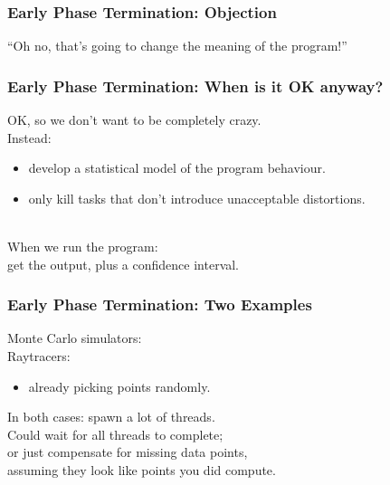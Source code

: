 \begin{frame}
  \frametitle{Early Phase Termination: Objection}

\Huge
\begin{center}
``Oh no, that's going to change the meaning of the program!''
\end{center}
\end{frame}

\begin{frame}
  \frametitle{Early Phase Termination: When is it OK anyway?}


OK, so we don't want to be completely crazy.\\[1em]

Instead: 
\begin{itemize}
\item develop a statistical model of the program behaviour.
\item only kill tasks that don't introduce unacceptable distortions.
\end{itemize}

~\\[1em]

When we run the program: \\ \qquad get the output, plus a confidence interval.



\end{frame}

\begin{frame}
  \frametitle{Early Phase Termination: Two Examples}



Monte Carlo simulators: \\
Raytracers:
\begin{itemize}
\item already picking points randomly.
\end{itemize}

In both cases: spawn a lot of threads.\\[1em]
Could wait for all threads to complete;\\
or just compensate for missing data points,\\
assuming they look like points you did compute.


\end{frame}

